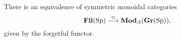 \begin{lem} \label{lem:FilAsGrMod}
There is an equivalence of symmetric monoidal categories
$$\operatorname{\mathbf{Fil}}(\operatorname{\mathrm{Sp}}) \stackrel{\simeq}{\longrightarrow} \textbf{Mod}_{A}(\operatorname{\mathbf{Gr}}(\operatorname{\mathrm{Sp}})),$$
given by the forgetful functor.
\end{lem}








